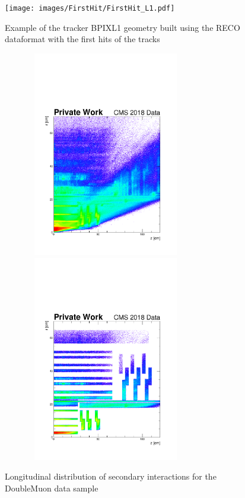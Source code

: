 \documentclass{cernatlasnote}
\begin{document}
\begin{figure}[ht]
\centering
\texttt{[image: images/FirstHit/FirstHit\_L1.pdf]}
\caption{\label{fig:trackermap} Example of the tracker BPIXL1 geometry built using the RECO dataformat with the first hits of the tracks}
\end{figure}

\begin{figure}[ht]
\centering
\includegraphics[height=9cm, width=9cm, trim= 0cm 0cm 0cm 0.cm,clip]{images/SecInt/DoubleMuon_UL2018_MiniAODv2_GT36-v1_hData_reco_SecInt_rz_Selec.pdf}\includegraphics[height=9cm, width=9cm, trim= 0cm 0cm 0cm 0.cm,clip]{images/SecInt/DoubleMuon_UL2018_MiniAODv2_GT36-v1_hData_reco_SecInt_rz_TrackerMatched.pdf}
\caption{\label{fig:longVeto} Longitudinal distribution of secondary interactions for the DoubleMuon data sample}
\end{figure}
\end{document}
